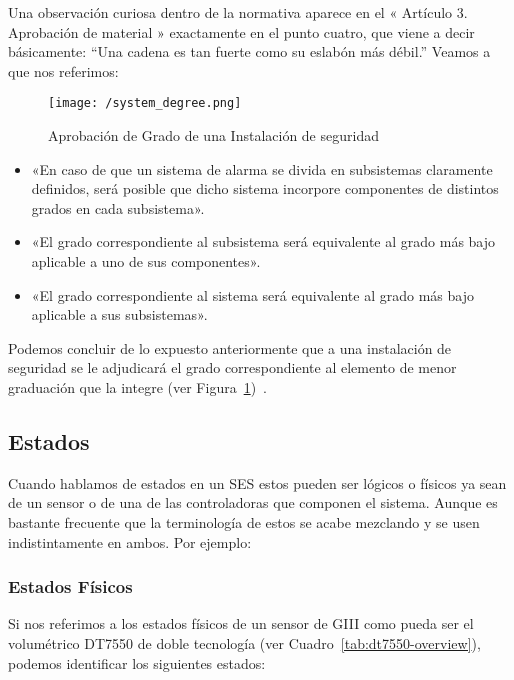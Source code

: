Una observación curiosa dentro de la normativa aparece en el « Artículo 3. Aprobación de material » exactamente en el punto cuatro, que viene a decir básicamente: ``Una cadena es tan fuerte como su eslabón más débil.'' Veamos a que nos referimos:

\begin{figure}[!h]
\centering
\texttt{[image: /system\_degree.png]}
\caption{Aprobación de Grado de una Instalación de seguridad}
\label{fig:system_degree}
\end{figure}

\begin{itemize}
\item «En caso de que un sistema de alarma se divida en subsistemas claramente definidos, será posible que dicho sistema incorpore componentes de distintos grados en cada subsistema».
\item «El grado correspondiente al subsistema será equivalente al grado más bajo aplicable a uno de sus componentes».
\item «El grado correspondiente al sistema será equivalente al grado más bajo aplicable a sus subsistemas».
\end{itemize}

Podemos concluir de lo expuesto anteriormente que a una instalación de seguridad se le adjudicará el grado correspondiente al elemento de menor graduación que la integre (ver Figura~\ref{fig:system_degree})~\cite{BOE}.

\subsection{Estados}
Cuando hablamos de estados en un \acf{SES} estos pueden ser lógicos o físicos ya sean de un sensor o de una de las controladoras que componen el sistema. Aunque es bastante frecuente que la terminología de estos se acabe mezclando y se usen indistintamente en ambos. Por ejemplo:

\subsubsection{Estados Físicos}
\label{sec:estados-fisicos}

Si nos  referimos a los  estados físicos  de un sensor  de \acf{GIII}
como  pueda  ser  el  volumétrico  DT7550  de  doble  tecnología  (ver
Cuadro~\ref{tab:dt7550-overview}), podemos  identificar los siguientes
estados:


